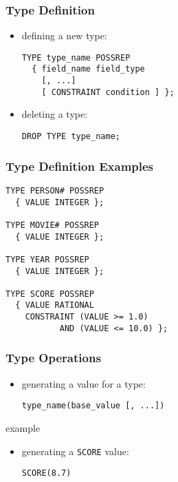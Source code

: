 \documentclass[dvipsnames]{beamer}
\theoremstyle{plain}
\begin{document}
\begin{frame}[fragile]
  \frametitle{Type Definition}

  \begin{itemize}
    \item defining a new type:
    \begin{lstlisting}
TYPE type_name POSSREP
  { field_name field_type
    [, ...]
    [ CONSTRAINT condition ] };
    \end{lstlisting}

    \item deleting a type:
    \begin{lstlisting}
DROP TYPE type_name;
    \end{lstlisting}
  \end{itemize}
\end{frame}

\begin{frame}[fragile]
  \frametitle{Type Definition Examples}

  \begin{lstlisting}
TYPE PERSON# POSSREP
  { VALUE INTEGER };

TYPE MOVIE# POSSREP
  { VALUE INTEGER };

TYPE YEAR POSSREP
  { VALUE INTEGER };

TYPE SCORE POSSREP
  { VALUE RATIONAL
    CONSTRAINT (VALUE >= 1.0)
           AND (VALUE <= 10.0) };
  \end{lstlisting}
\end{frame}

\begin{frame}[fragile]
  \frametitle{Type Operations}

  \begin{itemize}
    \item generating a value for a type:
    \begin{lstlisting}
type_name(base_value [, ...])
    \end{lstlisting}
  \end{itemize}

  \medskip
  \begin{exampleblock}{example}
    \begin{itemize}
      \item generating a \texttt{SCORE} value:
      \begin{lstlisting}
SCORE(8.7)
      \end{lstlisting}
    \end{itemize}
  \end{exampleblock}
\end{frame}
\end{document}
